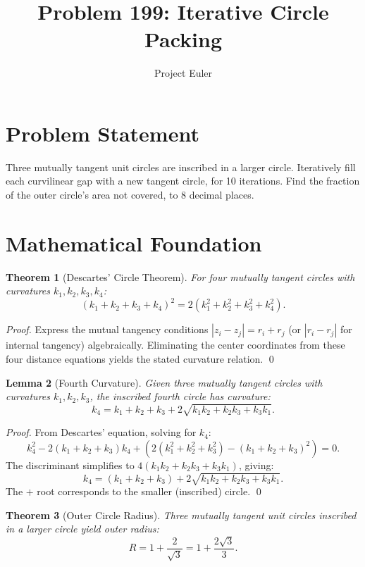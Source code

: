 \documentclass[12pt]{article}
\title{Problem 199: Iterative Circle Packing}
\author{Project Euler}
\date{}
\newtheorem{theorem}{Theorem}
\newtheorem{lemma}[theorem]{Lemma}
\begin{document}
\maketitle

\section{Problem Statement}

Three mutually tangent unit circles are inscribed in a larger circle. Iteratively fill each curvilinear gap with a new tangent circle, for 10 iterations. Find the fraction of the outer circle's area not covered, to 8 decimal places.

\section{Mathematical Foundation}

\begin{theorem}[Descartes' Circle Theorem]
For four mutually tangent circles with curvatures $k_1, k_2, k_3, k_4$:
\[
(k_1 + k_2 + k_3 + k_4)^2 = 2(k_1^2 + k_2^2 + k_3^2 + k_4^2).
\]
\end{theorem}

\begin{proof}
Express the mutual tangency conditions $|z_i - z_j| = r_i + r_j$ (or $|r_i - r_j|$ for internal tangency) algebraically. Eliminating the center coordinates from these four distance equations yields the stated curvature relation. \qed
\end{proof}

\begin{lemma}[Fourth Curvature]
Given three mutually tangent circles with curvatures $k_1, k_2, k_3$, the inscribed fourth circle has curvature:
\[
k_4 = k_1 + k_2 + k_3 + 2\sqrt{k_1 k_2 + k_2 k_3 + k_3 k_1}.
\]
\end{lemma}

\begin{proof}
From Descartes' equation, solving for $k_4$:
\[
k_4^2 - 2(k_1+k_2+k_3)k_4 + (2(k_1^2+k_2^2+k_3^2) - (k_1+k_2+k_3)^2) = 0.
\]
The discriminant simplifies to $4(k_1 k_2 + k_2 k_3 + k_3 k_1)$, giving:
\[
k_4 = (k_1+k_2+k_3) + 2\sqrt{k_1 k_2 + k_2 k_3 + k_3 k_1}.
\]
The $+$ root corresponds to the smaller (inscribed) circle. \qed
\end{proof}

\begin{theorem}[Outer Circle Radius]
Three mutually tangent unit circles inscribed in a larger circle yield outer radius:
\[
R = 1 + \frac{2}{\sqrt{3}} = 1 + \frac{2\sqrt{3}}{3}.
\]
\end{theorem}
\end{document}
